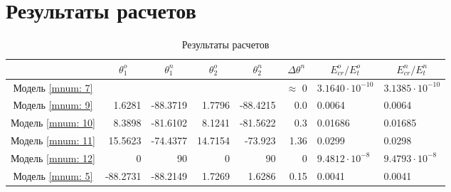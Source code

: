 \section{Результаты расчетов}

\begin{table}
\footnotesize
\centering
\caption{Результаты расчетов}
\renewcommand{\arraystretch}{1.5}
\begin{tabularx}{\textwidth}{C|rr|rr|r|ll}
				& &  &  &  & &  &  \\ \hline
\hline Модель \ref{mnum: 7} &  &  &  &  & $\approx$ 0   & $3.1640 \cdot 10^{-10}$ & $3.1385 \cdot 10^{-10}$ \\ 
 	   Модель \ref{mnum: 9} & 1.6281 & -88.3719 & 1.7796  & -88.4215  & 0.0  & 0.0064 & 0.0064 \\
 	   Модель \ref{mnum: 10} & 8.3898 & -81.6102 & 8.1241 & -81.5622 & 0.3 & 0.01686 & 0.01685 \\
 	   Модель \ref{mnum: 11} & 15.5623 & -74.4377 & 14.7154  & -73.923  & 1.36  & 0.0299 & 0.0298 \\
 	   Модель \ref{mnum: 12} & 0 & 90 & 0  & 90 & 0 & $9.4812 \cdot 10^{-8}$ & $9.4793 \cdot 10^{-8}$ \\
	   Модель \ref{mnum: 5} & -88.2731 & -88.2149 & 1.7269  & 1.6286  & 0.15 & 0.0041 & 0.0041 \\ 	   
 	   \hline
\end{tabularx} 
\renewcommand{\arraystretch}{1.0}
\end{table}

